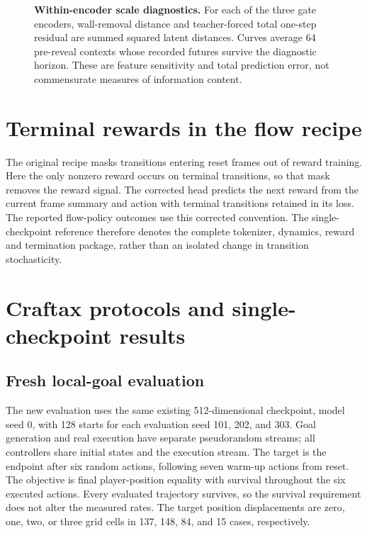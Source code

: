 \begin{table}[ht]
\centering
\caption{JEPA geometry and decoded wall intensity for model seed $0$, averaged over $64$
pre-reveal contexts. Distances use matched actions and the same encoder; total residuals include
all latent coordinates. Wall intensity is measured on shared wall pixels.}
\label{tab:latent}
\end{table}

\begin{figure}[t]
\centering
{}
\caption{\textbf{Within-encoder scale diagnostics.} For each of the three gate encoders, wall-removal
distance and teacher-forced total one-step residual are summed squared latent distances. Curves
average 64 pre-reveal contexts whose recorded futures survive the diagnostic horizon. These are
feature sensitivity and total prediction error, not commensurate measures of information content.}
\label{fig:geometry}
\end{figure}

\clearpage
\section{Terminal rewards in the flow recipe}
\label{app:rewardbug}

The original recipe masks transitions entering reset frames out of reward training. Here the only
nonzero reward occurs on terminal transitions, so that mask removes the reward signal.
The corrected head predicts the next reward from the current frame summary and action with
terminal transitions retained in its loss. The reported flow-policy outcomes use this corrected
convention. The single-checkpoint reference therefore denotes the complete tokenizer, dynamics,
reward and termination package, rather than an isolated change in transition stochasticity.


\section{Craftax protocols and single-checkpoint results}
\label{app:craftax}


\subsection{Fresh local-goal evaluation}
The new evaluation uses the same existing 512-dimensional checkpoint, model seed 0, with 128 starts
for each evaluation seed 101, 202, and 303. Goal generation and real execution have separate
pseudorandom streams; all controllers share initial states and the execution stream. The target is
the endpoint after six random actions, following seven warm-up actions from reset. The objective is
final player-position equality with survival throughout the six executed actions. Every evaluated
trajectory survives, so the survival requirement does not alter the measured rates. The target
position displacements are zero, one, two, or three grid cells in 137, 148, 84, and 15 cases,
respectively.

